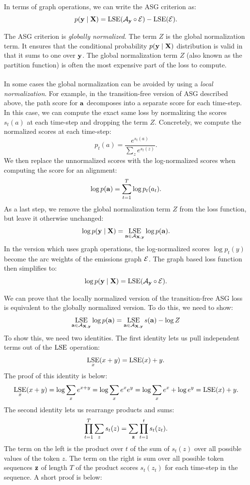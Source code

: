 In terms of graph operations, we can write the ASG criterion as:
\begin{equation}
    \label{eq:asg_graph_loss}
    p({\bf y} \mid {\bf X}) = \operatorname*{\textrm{LSE}}(\mathcal{A}_{\bf y} \circ \mathcal{E}) - \operatorname*{\textrm{LSE}}(\mathcal{E}).
\end{equation}

\begin{tcolorbox}[breakable, colback=white!95!black, colframe=white!45!black,
    sharp corners=all, title=Global or Local Normalization]

The ASG criterion is \emph{globally normalized}. The term $Z$ is the global
normalization term. It ensures that the conditional probability $p({\bf y} \mid
{\bf X})$ distribution is valid in that it sums to one over ${\bf y}$. The global
normalization term $Z$ (also known as the partition function) is often the
most expensive part of the loss to compute.
\\
\\
In some cases the global normalization can be avoided by using a \emph{local
normalization}. For example, in the transition-free version of ASG
described above, the path score for ${\bf a}$ decomposes into a separate score
for each time-step. In this case, we can compute the exact same loss by
normalizing the scores $s_t(a)$ at each time-step and dropping the term
$Z$. Concretely, we compute the normalized scores at each time-step:
$$
p_t(a) = \frac{e^{s_t(a)}}{\sum_z e^{s_t(z)}}.
$$
We then replace the unnormalized scores with the log-normalized scores when
computing the score for an alignment:
$$
\log p({\bf a}) = \sum_{t=1}^T \log p_t(a_t).
$$
As a last step, we remove the global normalization term $Z$ from the loss
function, but leave it otherwise unchanged:
$$
\log p({\bf y} \mid {\bf X}) = \operatorname*{\textrm{LSE}}_{{\bf a} \in \mathcal{A}_{{\bf X}, {\bf y}}} \log p({\bf a}).
$$
In the version which uses graph operations, the log-normalized scores $\log
p_t(y)$ become the arc weights of the emissions graph $\mathcal{E}$. The graph
based loss function then simplifies to:
$$
\log p({\bf y} \mid {\bf X}) = \operatorname*{\textrm{LSE}}(\mathcal{A}_{\bf y} \circ \mathcal{E}).
$$

We can prove that the locally normalized version of the transition-free ASG loss is equivalent to the globally normalized version. To do this, we need to show:
\begin{equation}
\label{eq:local_global}
\operatorname*{\textrm{LSE}}_{{\bf a} \in \mathcal{A}_{{\bf X}, {\bf y}}} \log p({\bf a}) = \operatorname*{\textrm{LSE}}_{{\bf a} \in \mathcal{A}_{{\bf X}, {\bf y}}} s({\bf a}) - \log Z
\end{equation}
To show this, we need two identities. The first identity lets us pull
independent terms out of the $\operatorname*{\textrm{LSE}}$ operation:
$$
\operatorname*{\textrm{LSE}}_x(x + y) = \operatorname*{\textrm{LSE}}(x) + y.
$$
The proof of this identity is below:
$$
\operatorname*{\textrm{LSE}}_x (x + y) = \log \sum_x e^{x+y} = \log \sum_x e^x e^y = \log \sum_x e^x + \log e^y = \operatorname*{\textrm{LSE}}(x) + y.
$$
The second identity lets us rearrange products and sums:
$$
\prod_{t=1}^T \sum_{z} s_t(z) = \sum_{\bf z} \prod_{t=1}^t s_t(z_t).
$$
The term on the left is the product over $t$ of the sum of $s_t(z)$ over all
possible values of the token $z$. The term on the right is sum over all
possible token sequences ${\bf z}$ of length $T$ of the product scores
$s_t(z_t)$ for each time-step in the sequence. A short proof is below:


\end{tcolorbox}
